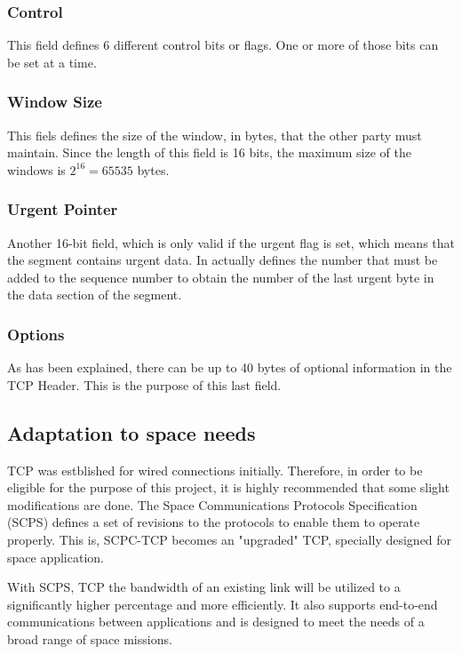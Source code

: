 \documentclass[12pt,a4paper]{report}
\begin{document}
\subsubsection{Control}
This field defines 6 different control bits or flags. One or more of those bits can be set at a time. 

\subsubsection{Window Size}
This fiels defines the size of the window, in bytes, that the other party must maintain. Since the length of this field is 16 bits, the maximum size of the windows is $2^{16}=65535$ bytes.  

\subsubsection{Urgent Pointer}
Another 16-bit field, which is only valid if the urgent flag is set, which means that the segment contains urgent data. In actually defines the number that must be added to the sequence number to obtain the number of the last urgent byte in the data section of the segment. 

\subsubsection{Options}
As has been explained, there can be up to 40 bytes of optional information in the TCP Header. This is the purpose of this last field. 

\subsection{Adaptation to space needs}

TCP was estblished for wired connections initially. Therefore, in order to be eligible for the purpose of this project, it is highly recommended that some slight modifications are done. The Space Communications Protocols Specification (SCPS) defines a set of revisions to the protocols to enable them to operate properly. This is, SCPC-TCP becomes an "upgraded" TCP, specially designed for space application.  

With SCPS, TCP the bandwidth of an existing link will be utilized to a significantly higher percentage and more efficiently. It also supports end-to-end communications between applications and is designed to meet the needs of a broad range of space missions. 
\end{document}
